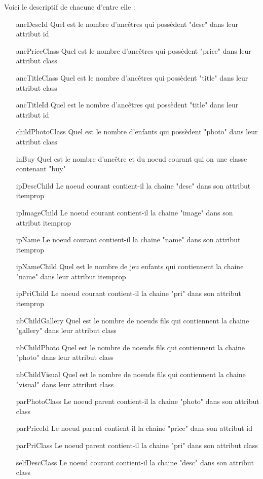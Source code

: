 \documentclass{article}
\begin{document}
Voici le descriptif de chacune d'entre elle :
\begin{itemize}
    \item[ancDescId] Quel est le nombre d'ancêtres qui possèdent "desc" dans leur attribut id
    \item[ancPriceClass] Quel est le nombre d'ancêtres qui possèdent "price" dans leur attribut class
    \item[ancTitleClass] Quel est le nombre d'ancêtres qui possèdent "title" dans leur attribut class
    \item[ancTitleId] Quel est le nombre d'ancêtres qui possèdent "title" dans leur attribut id
    \item[childPhotoClass] Quel est le nombre d'enfants qui possèdent "photo" dans leur attribut class
    \item[inBuy] Quel est le nombre d'ancêtre et du noeud courant qui on une classe contenant "buy"
    \item[ipDescChild] Le noeud courant contient-il la chaine "desc" dans son attribut itemprop
    \item[ipImageChild] Le noeud courant contient-il la chaine "image" dans son attribut itemprop
    \item[ipName] Le noeud courant contient-il la chaine "name" dans son attribut itemprop
    \item[ipNameChild] Quel est le nombre de jeu enfants qui contiennent la chaine "name" dans leur attribut itemprop
    \item[ipPriChild] Le noeud courant contient-il la chaine "pri" dans son attribut itemprop
    \item[nbChildGallery] Quel est le nombre de noeuds fils qui contiennent la chaine "gallery" dans leur attribut class
    \item[nbChildPhoto] Quel est le nombre de noeuds fils qui contiennent la chaine "photo" dans leur attribut class
    \item[nbChildVisual] Quel est le nombre de noeuds fils qui contiennent la chaine "visual" dans leur attribut class
    \item[parPhotoClass] Le noeud parent contient-il la chaine "photo" dans son attribut class
    \item[parPriceId] Le noeud parent contient-il la chaine "price" dans son attribut id
    \item[parPriClass] Le noeud parent contient-il la chaine "pri" dans son attribut class
    \item[selfDescClass] Le noeud courant contient-il la chaine "desc" dans son attribut class

\end{itemize}
\end{document}
